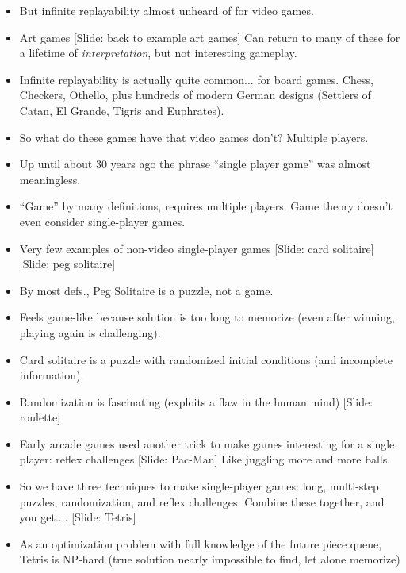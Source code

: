\documentclass[12pt]{article}
\begin{document}
{\begin{itemize}
\item But infinite replayability almost unheard of for video games.

\item Art games [Slide:  back to example art games]  Can return to many of these for a lifetime of {\it interpretation}, but not interesting gameplay.

\item Infinite replayability is actually quite common... for board games.  Chess, Checkers, Othello, plus hundreds of modern German designs (Settlers of Catan, El Grande, Tigris and Euphrates).

\item So what do these games have that video games don't?  Multiple players.

\item Up until about 30 years ago the phrase ``single player game'' was almost meaningless.  

\item ``Game'' by many definitions, requires multiple players.  Game theory doesn't even consider single-player games.


\item Very few examples of non-video single-player games [Slide: card solitaire] [Slide: peg solitaire]

\item By most defs., Peg Solitaire is a puzzle, not a game.  

\item Feels game-like because solution is too long to memorize (even after winning, playing again is challenging).

\item Card solitaire is a puzzle with randomized initial conditions (and incomplete information).

\item Randomization is fascinating (exploits a flaw in the human mind) [Slide: roulette]

\item Early arcade games used another trick to make games interesting for a single player:  reflex challenges [Slide:  Pac-Man]  Like juggling more and more balls.

\item So we have three techniques to make single-player games:  long, multi-step puzzles, randomization, and reflex challenges.  Combine these together, and you get.... [Slide:  Tetris]

\item As an optimization problem with full knowledge of the future piece queue, Tetris is NP-hard (true solution nearly impossible to find, let alone memorize)


\end{itemize}}
\end{document}
